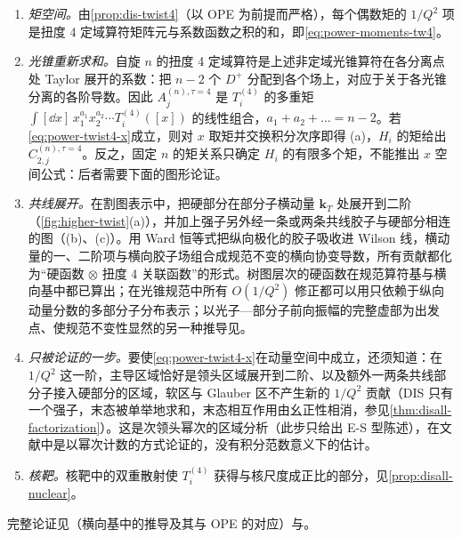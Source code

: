 \begin{proofsketch}
\begin{enumerate}[label=\arabic*.,leftmargin=1.6em,itemsep=1pt,topsep=2pt]
\item \emph{矩空间。}由\cref{prop:dis-twist4}（以 OPE 为前提而严格），每个偶数矩的 $1/Q^2$ 项是扭度 4 定域算符矩阵元与系数函数之积的和，即\eqref{eq:power-moments-tw4}。
\item \emph{光锥重新求和。}自旋 $n$ 的扭度 4 定域算符是上述非定域光锥算符在各分离点处 Taylor 展开的系数：把 $n-2$ 个 $D^+$ 分配到各个场上，对应于关于各光锥分离的各阶导数。因此 $A^{(n),\tau=4}_j$ 是 $T^{(4)}_i$ 的多重矩 $\int[\dd x]\,x_1^{a_1}x_2^{a_2}\cdots T^{(4)}_i([x])$ 的线性组合，$a_1+a_2+\dots=n-2$。若\eqref{eq:power-twist4-x}成立，则对 $x$ 取矩并交换积分次序即得 (a)，$H_i$ 的矩给出 $C^{(n),\tau=4}_{2,j}$。反之，固定 $n$ 的矩关系只确定 $H_i$ 的有限多个矩，不能推出 $x$ 空间公式：后者需要下面的图形论证。
\item \emph{共线展开。}在割图表示中，把硬部分在部分子横动量 $\mathbf k_T$ 处展开到二阶（\cref{fig:higher-twist}(a)），并加上强子另外经一条或两条共线胶子与硬部分相连的图（(b)、(c)）。用 Ward 恒等式把纵向极化的胶子吸收进 Wilson 线，横动量的一、二阶项与横向胶子场组合成规范不变的横向协变导数，所有贡献都化为“硬函数 $\otimes$ 扭度 4 关联函数”的形式\cite{EllisFurmanskiPetronzio1982,EllisFurmanskiPetronzio1983}。树图层次的硬函数在规范算符基\cite{Jaffe:1982pm}与横向基\cite{EllisFurmanskiPetronzio1983}中都已算出；在光锥规范中所有 $O(1/Q^2)$ 修正都可以用只依赖于纵向动量分数的多部分子分布表示\cite{Jaffe1983}；以光子—部分子前向振幅的完整虚部为出发点、使规范不变性显然的另一种推导见\cite{Qiu:1988dn}。
\item \emph{只被论证的一步。}要使\eqref{eq:power-twist4-x}在动量空间中成立，还须知道：在 $1/Q^2$ 这一阶，主导区域恰好是领头区域展开到二阶、以及额外一两条共线部分子接入硬部分的区域，软区与 Glauber 区不产生新的 $1/Q^2$ 贡献（DIS 只有一个强子，末态被单举地求和，末态相互作用由幺正性相消，参见\cref{thm:disall-factorization}）。这是次领头幂次的区域分析（此步只给出 E-S 型陈述），在文献中是以幂次计数的方式论证的，没有积分范数意义下的估计。
\item \emph{核靶。}核靶中的双重散射使 $T^{(4)}_i$ 获得与核尺度成正比的部分，见\cref{prop:disall-nuclear}。
\end{enumerate}
完整论证见\cite{EllisFurmanskiPetronzio1983}（横向基中的推导及其与 OPE 的对应）与\cite{Qiu:1988dn}。
\end{proofsketch}

